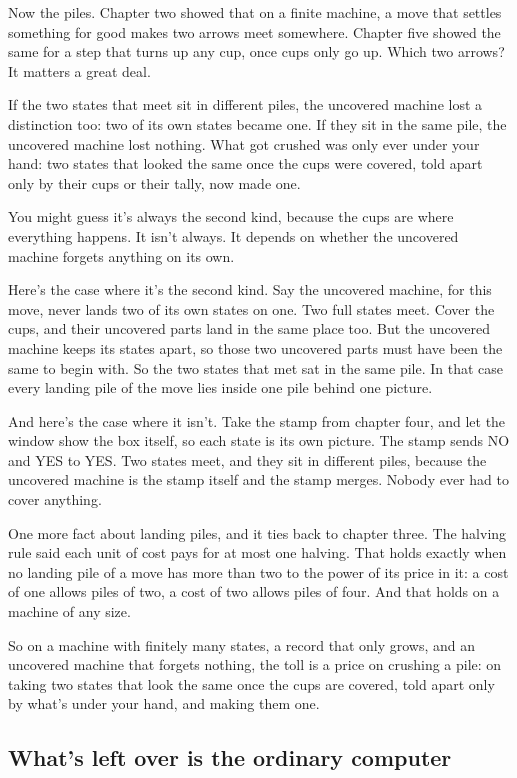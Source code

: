 \documentclass[11pt,twoside]{article}
\theoremstyle{thielethm}
\theoremstyle{thieledef}
\theoremstyle{thieledef}
\theoremstyle{thieledef}
\theoremstyle{thielethm}
\theoremstyle{thieleobs}
\theoremstyle{thielethm}
\begin{document}
Now the piles. Chapter two showed that on a finite machine, a move that settles something for good makes two arrows meet somewhere. Chapter five showed the same for a step that turns up any cup, once cups only go up. Which two arrows? It matters a great deal.

If the two states that meet sit in different piles, the uncovered machine lost a distinction too: two of its own states became one. If they sit in the same pile, the uncovered machine lost nothing. What got crushed was only ever under your hand: two states that looked the same once the cups were covered, told apart only by their cups or their tally, now made one.

You might guess it's always the second kind, because the cups are where everything happens. It isn't always. It depends on whether the uncovered machine forgets anything on its own.

Here's the case where it's the second kind. Say the uncovered machine, for this move, never lands two of its own states on one. Two full states meet. Cover the cups, and their uncovered parts land in the same place too. But the uncovered machine keeps its states apart, so those two uncovered parts must have been the same to begin with. So the two states that met sat in the same pile. In that case every landing pile of the move lies inside one pile behind one picture.

And here's the case where it isn't. Take the stamp from chapter four, and let the window show the box itself, so each state is its own picture. The stamp sends NO and YES to YES. Two states meet, and they sit in different piles, because the uncovered machine is the stamp itself and the stamp merges. Nobody ever had to cover anything.

One more fact about landing piles, and it ties back to chapter three. The halving rule said each unit of cost pays for at most one halving. That holds exactly when no landing pile of a move has more than two to the power of its price in it: a cost of one allows piles of two, a cost of two allows piles of four. And that holds on a machine of any size.

So on a machine with finitely many states, a record that only grows, and an uncovered machine that forgets nothing, the toll is a price on crushing a pile: on taking two states that look the same once the cups are covered, told apart only by what's under your hand, and making them one.

\subsection{What's left over is the ordinary computer}
\end{document}

